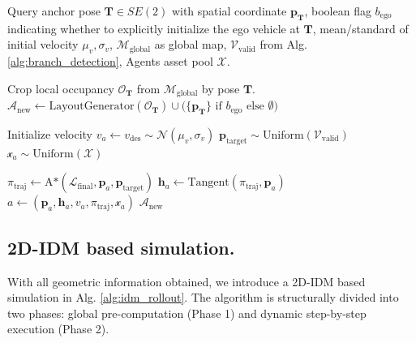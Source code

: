 \begin{algorithm}[tb]
    \caption{Spatially-conditioned agent generation and routing initialization}
    \label{alg:spawnagents}
    \begin{algorithmic}[1]

    \Require Query anchor pose $\mathbf{T} \in SE(2)$ with spatial coordinate $\mathbf{p}_{\mathbf{T}}$, boolean flag $b_{\text{ego}}$ indicating whether to explicitly initialize the ego vehicle at $\mathbf{T}$, mean/standard of initial velocity $\mu_v, \sigma_v$, $\mathcal{M}_{\text{global}}$ as global map, $\mathcal{V}_{\text{valid}}$ from Alg. \ref{alg:branch_detection}, Agents asset pool $\mathcal{X}$.
    
    \State Crop local occupancy $\mathcal{O}_{\mathbf{T}}$ from $\mathcal{M}_{\text{global}}$ by pose $\mathbf{T}$.
    \State $\mathcal{A}_{\text{new}} \gets \text{LayoutGenerator}(\mathcal{O}_{\mathbf{T}}) \cup \big( \{\mathbf{p}_{\mathbf{T}}\} \text{ if } b_{\text{ego}} \text{ else } \emptyset \big)$ 

        \State Initialize velocity $v_a \gets v_{\text{des}} \sim \mathcal{N}(\mu_v, \sigma_v)$
        \State $\mathbf{p}_{\text{target}} \sim \text{Uniform}(\mathcal{V}_{\text{valid}})$  
        \State $\mathcal{x}_a \sim \text{Uniform}(\mathcal{X})$ 
        
        \State $\pi_{\text{traj}} \gets \text{A*}(\mathcal{L}_{\text{final}}, \mathbf{p}_a, \mathbf{p}_{\text{target}})$ 
        \State $\mathbf{h}_a \gets \text{Tangent}(\pi_{\text{traj}}, \mathbf{p}_a)$ 
        \State $a \gets (\mathbf{p}_a, \mathbf{h}_a, v_a, \pi_{\text{traj}}, \mathcal{x}_a)$ 
    \EndFor
    \State \Return $\mathcal{A}_{\text{new}}$
    \end{algorithmic}
\end{algorithm}

\subsection{2D-IDM based simulation.} With all geometric information obtained, we introduce a 2D-IDM based simulation in Alg. \ref{alg:idm_rollout}. The algorithm is structurally divided into two phases: global pre-computation (Phase 1) and dynamic step-by-step execution (Phase 2).

